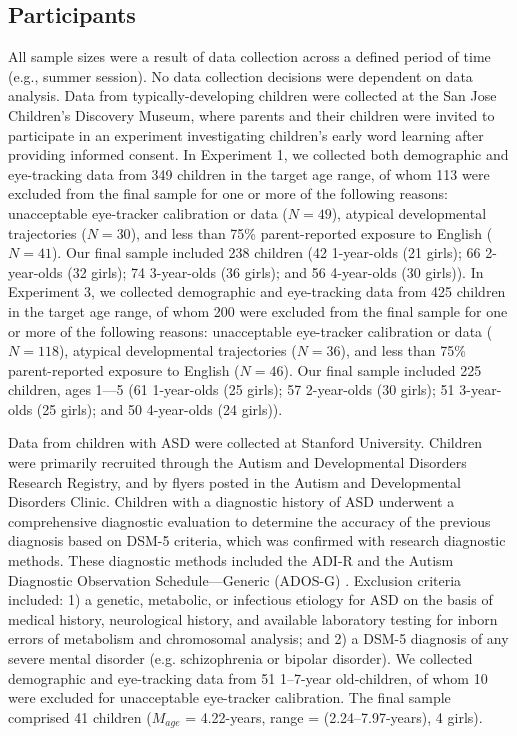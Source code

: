 \documentclass[jou,floatsintext]{apa6}
\begin{document}
\subsection{Participants} All sample sizes were a result of data collection across a defined period of time (e.g., summer session). No data collection decisions were dependent on data analysis. Data from typically-developing children were collected at the San Jose Children's Discovery Museum, where parents and their children were invited to participate in an experiment investigating children's early word learning after providing informed consent.
In Experiment 1, we collected both demographic and eye-tracking data from 349 children in the target age range, of whom 113 were excluded from the final sample for one or more of the following reasons: unacceptable eye-tracker calibration or data ({\small$N=49$}), atypical developmental trajectories ({\small$N=30$}), and less than 75\% parent-reported exposure to English ({\small$N=41$}). Our final sample included 238 children (42 1-year-olds (21 girls); 66 2-year-olds (32 girls); 74 3-year-olds (36 girls); and 56 4-year-olds (30 girls)). In Experiment 3, we collected demographic and eye-tracking data from 425 children in the target age range, of whom 200 were excluded from the final sample for one or more of the following reasons: unacceptable eye-tracker calibration or data ({\small$N=118$}), atypical developmental trajectories ({\small$N=36$}), and less than 75\% parent-reported exposure to English ({\small$N=46$}). Our final sample included 225 children, ages 1---5 (61 1-year-olds (25 girls); 57 2-year-olds (30 girls); 51 3-year-olds (25 girls); and 50 4-year-olds (24 girls)).

Data from children with ASD were collected at Stanford University. Children were primarily recruited through the Autism and Developmental Disorders Research Registry, and by flyers posted in the Autism and Developmental Disorders Clinic. Children with a diagnostic history of ASD underwent a comprehensive diagnostic evaluation to determine the accuracy of the previous diagnosis based on DSM-5 criteria, which was confirmed with research diagnostic methods. These diagnostic methods included the ADI-R \cite{lord1994,le-couter1989} and the Autism Diagnostic Observation Schedule---Generic (ADOS-G) \cite{lord1999,lord2000}. Exclusion criteria included: 1) a genetic, metabolic, or infectious etiology for ASD on the basis of medical history, neurological history, and available laboratory testing for inborn errors of metabolism and chromosomal analysis; and 2) a DSM-5 diagnosis of any severe mental disorder (e.g. schizophrenia or bipolar disorder). We collected demographic and eye-tracking data from 51 1--7-year old-children, of whom 10 were excluded for unacceptable eye-tracker calibration. The final sample comprised 41 children ({\small$M_{age}$} = 4.22-years, range = (2.24--7.97-years), 4 girls).
\end{document}
